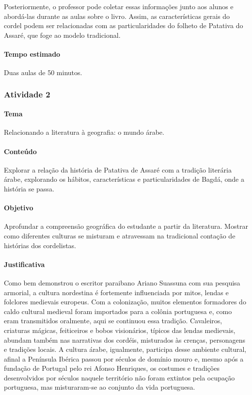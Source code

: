 \documentclass[11pt]{extarticle}
\begin{document}
Posteriormente, o professor pode coletar essas informações junto aos alunos e abordá-las durante as aulas sobre o livro. Assim, as características gerais do cordel podem ser relacionadas com as particularidades do folheto de Patativa do Assaré, que foge ao modelo tradicional.


\paragraph{Tempo estimado} Duas aulas de 50 minutos.


\subsubsection{Atividade 2}


\paragraph{Tema} Relacionando a literatura à geografia: o mundo árabe.

\paragraph{Conteúdo} Explorar a relação da história de Patativa de Assaré com a tradição literária árabe, explorando os hábitos, características e particularidades de Bagdá, onde a história se passa.

\paragraph{Objetivo} Aprofundar a compreensão geográfica do estudante a partir da literatura. Mostrar como diferentes culturas se misturam e atravessam na tradicional contação de histórias dos cordelistas. 

\paragraph{Justificativa} Como bem demonstrou o escritor paraibano Ariano Suassuna com sua pesquisa armorial, a cultura nordestina é fortemente influenciada por mitos, lendas e folclores medievais europeus. Com a colonização, muitos elementos formadores do caldo cultural medieval foram importados para a colônia portuguesa e, como eram transmitidos oralmente, aqui se continuou essa tradição. Cavaleiros, criaturas mágicas, feiticeiros e bobos visionários, típicos das lendas medievais, abundam também nas narrativas dos cordéis, misturados às crenças, personagens e tradições locais. A cultura árabe, igualmente, participa desse ambiente cultural, afinal a Península Ibérica passou por séculos de domínio mouro e, mesmo após a fundação de Portugal pelo rei Afonso Henriques, os costumes e tradições desenvolvidos por séculos naquele território não foram extintos pela ocupação portuguesa, mas misturaram-se ao conjunto da vida portuguesa.
\end{document}
